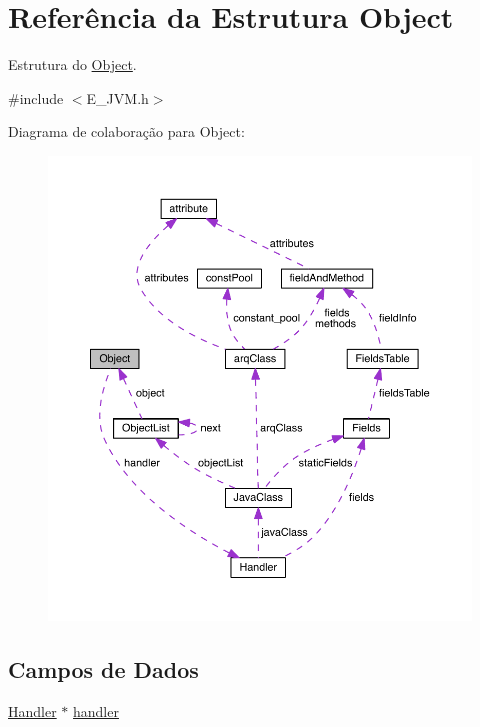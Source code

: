 \hypertarget{struct_object}{}\section{Referência da Estrutura Object}
\label{struct_object}


Estrutura do \hyperlink{struct_object}{Object}.  




{\ttfamily \#include $<$E\+\_\+\+J\+V\+M.\+h$>$}



Diagrama de colaboração para Object\+:
\nopagebreak
\begin{figure}[H]
\begin{center}
\leavevmode
\includegraphics[width=350pt]{struct_object__coll__graph}
\end{center}
\end{figure}
\subsection*{Campos de Dados}
\begin{DoxyCompactItemize}
\item 
\hyperlink{struct_handler}{Handler} $\ast$ \hyperlink{struct_object_aad3f75cdc4a1d18ef18974c6106d64ad}{handler}
\end{DoxyCompactItemize}



